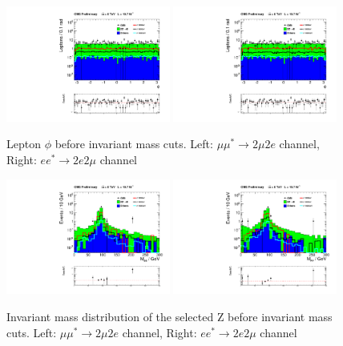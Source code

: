 \begin{figure}[hp!]
\begin{center}
\includegraphics[width=0.48\textwidth]{plot/Phi_2mu2e.pdf} 
\includegraphics[width=0.48\textwidth]{plot/Phi_2e2mu.pdf}
\end{center}
\caption{\label{fig:leptonPhi}Lepton $\phi$ before invariant mass cuts. Left: $\mu\mu^{*}\rightarrow 2\mu2e$ channel, Right: $ee^{*}\rightarrow 2e2\mu$ channel}
\end{figure}


\begin{figure}[hp!]
\begin{center}
\includegraphics[width=0.48\textwidth]{plot/Z_2mu2e.pdf} 
\includegraphics[width=0.48\textwidth]{plot/Z_2e2mu.pdf}
\end{center}
\caption{\label{fig:MinvZ}Invariant mass distribution of the selected Z before invariant mass cuts. Left: $\mu\mu^{*}\rightarrow 2\mu2e$ channel, Right: $ee^{*}\rightarrow 2e2\mu$ channel}
\end{figure}


